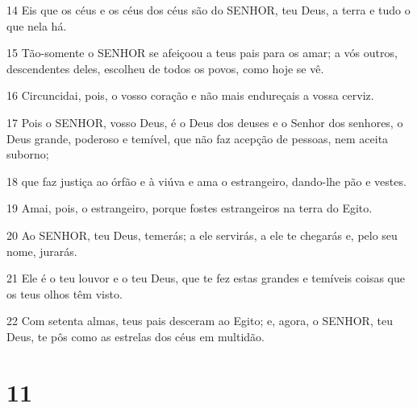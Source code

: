 \par 14 Eis que os céus e os céus dos céus são do SENHOR, teu Deus, a terra e tudo o que nela há.
\par 15 Tão-somente o SENHOR se afeiçoou a teus pais para os amar; a vós outros, descendentes deles, escolheu de todos os povos, como hoje se vê.
\par 16 Circuncidai, pois, o vosso coração e não mais endureçais a vossa cerviz.
\par 17 Pois o SENHOR, vosso Deus, é o Deus dos deuses e o Senhor dos senhores, o Deus grande, poderoso e temível, que não faz acepção de pessoas, nem aceita suborno;
\par 18 que faz justiça ao órfão e à viúva e ama o estrangeiro, dando-lhe pão e vestes.
\par 19 Amai, pois, o estrangeiro, porque fostes estrangeiros na terra do Egito.
\par 20 Ao SENHOR, teu Deus, temerás; a ele servirás, a ele te chegarás e, pelo seu nome, jurarás.
\par 21 Ele é o teu louvor e o teu Deus, que te fez estas grandes e temíveis coisas que os teus olhos têm visto.
\par 22 Com setenta almas, teus pais desceram ao Egito; e, agora, o SENHOR, teu Deus, te pôs como as estrelas dos céus em multidão.

\chapter{11}


